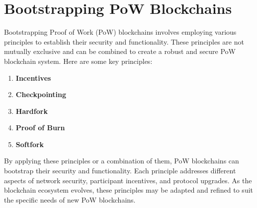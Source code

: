 \section{Bootstrapping PoW Blockchains}
Bootstrapping Proof of Work (PoW) blockchains involves employing various principles to establish their security and functionality. These principles are not mutually exclusive and can be combined to create a robust and secure PoW blockchain system. Here are some key principles:
\begin{enumerate}
	\item \textbf{Incentives}
	\item \textbf{Checkpointing}
	\item \textbf{Hardfork}
	\item \textbf{Proof of Burn}
	\item \textbf{Softfork}
\end{enumerate}
By applying these principles or a combination of them, PoW blockchains can bootstrap their security and functionality. Each principle addresses different aspects of network security, participant incentives, and protocol upgrades. As the blockchain ecosystem evolves, these principles may be adapted and refined to suit the specific needs of new PoW blockchains.

